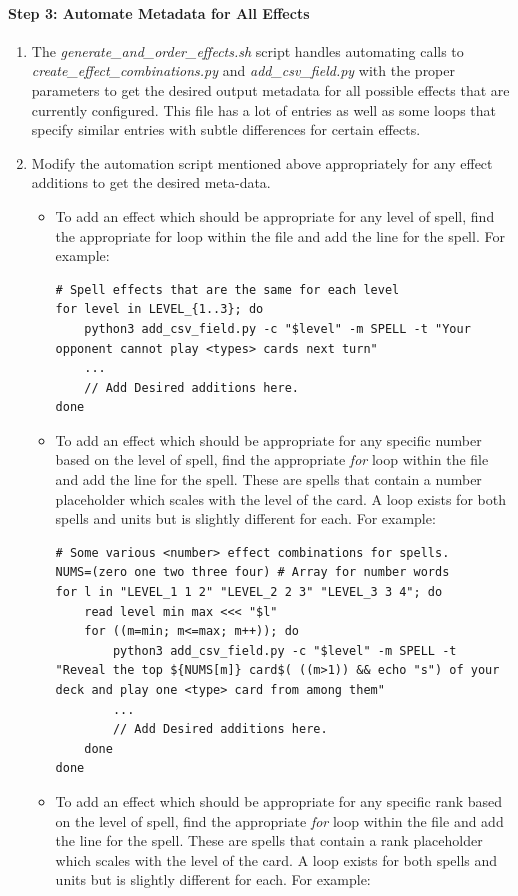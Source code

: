 \paragraph{Step 3: Automate Metadata for All Effects}
\begin{enumerate}
	\item The \textit{generate\_and\_order\_effects.sh} script handles automating calls to \textit{create\_effect\_combinations.py } and \textit{add\_csv\_field.py} with the proper parameters to get the desired output metadata for all possible effects that are currently configured. This file has a lot of entries as well as some loops that specify similar entries with subtle differences for certain effects.
	\item Modify the automation script mentioned above appropriately for any effect additions to get the desired meta-data.
	\begin{itemize}
		\item To add an effect which should be appropriate for any level of spell, find the appropriate for loop within the file and add the line for the spell. For example:
\begin{lstlisting}[style=shellstyle]
# Spell effects that are the same for each level
for level in LEVEL_{1..3}; do
    python3 add_csv_field.py -c "$level" -m SPELL -t "Your opponent cannot play <types> cards next turn"
    ...
    // Add Desired additions here.
done
\end{lstlisting}
		\item To add an effect which should be appropriate for any specific number based on the level of spell, find the appropriate \textit{for} loop within the file and add the line for the spell. These are spells that contain a number placeholder which scales with the level of the card. A loop exists for both spells and units but is slightly different for each. For example:
\begin{lstlisting}[style=shellstyle]
# Some various <number> effect combinations for spells.
NUMS=(zero one two three four) # Array for number words
for l in "LEVEL_1 1 2" "LEVEL_2 2 3" "LEVEL_3 3 4"; do
	read level min max <<< "$l"
	for ((m=min; m<=max; m++)); do
		python3 add_csv_field.py -c "$level" -m SPELL -t "Reveal the top ${NUMS[m]} card$( ((m>1)) && echo "s") of your deck and play one <type> card from among them"
		...
		// Add Desired additions here.
	done
done
\end{lstlisting}
		\item To add an effect which should be appropriate for any specific rank based on the level of spell, find the appropriate \textit{for} loop within the file and add the line for the spell. These are spells that contain a rank placeholder which scales with the level of the card. A loop exists for both spells and units but is slightly different for each. For example:

\end{itemize}
\end{enumerate}
